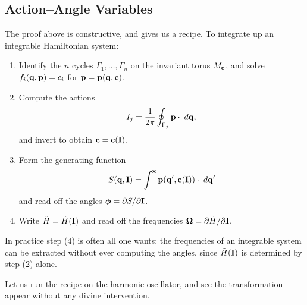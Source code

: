 \documentclass[a4paper]{scrartcl}
\begin{document}
\subsection{Action--Angle Variables}

The proof above is constructive, and gives us a recipe. To integrate up an integrable Hamiltonian system:
\begin{enumerate}[label=(\arabic*)]
	\item Identify the $n$ cycles $\Gamma_1,\dots,\Gamma_n$ on the invariant torus $M_{\mathbf{c}}$, and solve $f_i(\mathbf{q}, \mathbf{p}) = c_i$ for $\mathbf{p} = \mathbf{p}(\mathbf{q}, \mathbf{c})$.
	\item Compute the actions
	$$
	I_j = \frac{1}{2\pi}\oint_{\Gamma_j}\mathbf{p}\cdot\; d\mathbf{q},
	$$
	and invert to obtain $\mathbf{c} = \mathbf{c}(\mathbf{I})$.
	\item Form the generating function
	$$
	S(\mathbf{q}, \mathbf{I}) = \int^{\mathbf{x}}\mathbf{p}(\mathbf{q}', \mathbf{c}(\mathbf{I}))\cdot\; d\mathbf{q}'
	$$
	and read off the angles $\bm\phi = \partial S/\partial \mathbf{I}$.
	\item Write $\tilde H = \tilde H(\mathbf{I})$ and read off the frequencies $\bm\Omega = \partial\tilde H/\partial\mathbf{I}$.
\end{enumerate}
In practice step (4) is often all one wants: the frequencies of an integrable system can be extracted without ever computing the angles, since $\tilde H(\mathbf{I})$ is determined by step (2) alone.

Let us run the recipe on the harmonic oscillator, and see the transformation appear without any divine intervention.
\end{document}

